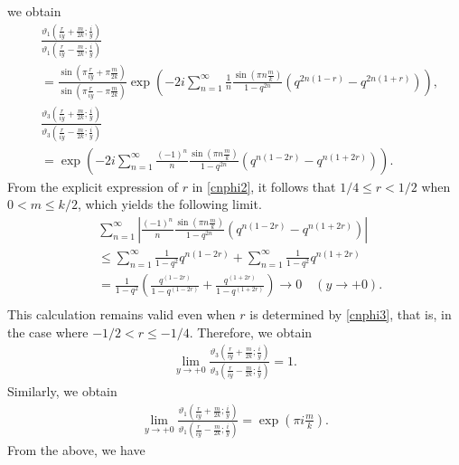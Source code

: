 \documentclass[10pt,leqno]{amsart}
\numberwithin{equation}{section}
\begin{document}
we obtain
\begin{equation}
\begin{split}
 &\frac{\vartheta_1 \left(\frac{r}{iy}+\frac{m}{2k}; \frac{i}{y}\right)}{\vartheta_1 \left(\frac{r}{iy}-\frac{m}{2k}; \frac{i}{y}\right)}\\
 &=\frac{\sin\left(\pi\frac{r}{iy}+\pi\frac{m}{2k}\right)}{\sin\left(\pi\frac{r}{iy}-\pi\frac{m}{2k}\right)}\exp{\left(-2i\sum_{n=1}^\infty \frac{1}{n}\frac{\sin (\pi n\frac{m}{k})}{1-q^{2n}}\left(q^{2n(1-r)}-q^{2n(1+r)}\right)\right)},\\
    &\frac{\vartheta_3 \left(\frac{r}{iy}+\frac{m}{2k}; \frac{i}{y}\right)}{\vartheta_3 \left(\frac{r}{iy}-\frac{m}{2k}; \frac{i}{y}\right)}\\
    &=\exp{\left(-2i\sum_{n=1}^\infty \frac{(-1)^n}{n}\frac{\sin (\pi n\frac{m}{k})}{1-q^{2n}}\left(q^{n(1-2r)}-q^{n(1+2r)}\right)\right)}.
 \end{split}
\end{equation}
From the explicit expression of $r$ in \eqref{cnphi2}, it follows that $1/4\leq r<1/2$ when $0<m\leq k/2$, which yields the following limit.
\begin{equation}
\begin{split}
    &\sum_{n=1}^\infty \left| \frac{(-1)^n}{n}\frac{\sin (\pi n\frac{m}{k})}{1-q^{2n}}\left(q^{n(1-2r)}-q^{n(1+2r)}\right)\right|\\
    &\leq\sum_{n=1}^\infty \frac{1}{1-q^{2}}q^{n(1-2r)}+\sum_{n=1}^\infty \frac{1}{1-q^{2}}q^{n(1+2r)}\\
    &=\frac{1}{1-q^{2}}\left(\frac{q^{(1-2r)}}{1-q^{(1-2r)}}+\frac{q^{(1+2r)}}{1-q^{(1+2r)}}\right)\rightarrow 0\quad(y\rightarrow +0).\\
    \end{split}
\end{equation}
This calculation remains valid even when $r$ is determined by \eqref{cnphi3}, that is, in the case where $-1/2 < r \leq -1/4$.
Therefore, we obtain
\begin{align}
    \lim_{y\to +0}\frac{\vartheta_3 \left(\frac{r}{iy}+\frac{m}{2k}; \frac{i}{y}\right)}{\vartheta_3 \left(\frac{r}{iy}-\frac{m}{2k}; \frac{i}{y}\right)}=1.
\end{align}
Similarly, we obtain
\begin{align}
    \lim_{y\to +0}\frac{\vartheta_1 \left(\frac{r}{iy}+\frac{m}{2k}; \frac{i}{y}\right)}{\vartheta_1 \left(\frac{r}{iy}-\frac{m}{2k}; \frac{i}{y}\right)}=\exp{\left(\pi i\frac{m}{k}\right)}.
\end{align}
From the above, we have
\end{document}
